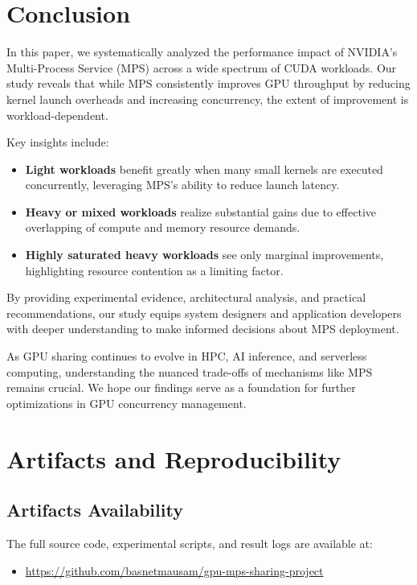 \documentclass[sigconf,nonacm]{acmart}
\begin{document}
\section{Conclusion}

In this paper, we systematically analyzed the performance impact of NVIDIA’s Multi-Process Service (MPS) across a wide spectrum of CUDA workloads. Our study reveals that while MPS consistently improves GPU throughput by reducing kernel launch overheads and increasing concurrency, the extent of improvement is workload-dependent.

Key insights include:

\begin{itemize}
    \item \textbf{Light workloads} benefit greatly when many small kernels are executed concurrently, leveraging MPS’s ability to reduce launch latency.
    \item \textbf{Heavy or mixed workloads} realize substantial gains due to effective overlapping of compute and memory resource demands.
    \item \textbf{Highly saturated heavy workloads} see only marginal improvements, highlighting resource contention as a limiting factor.
\end{itemize}

By providing experimental evidence, architectural analysis, and practical recommendations, our study equips system designers and application developers with deeper understanding to make informed decisions about MPS deployment.

As GPU sharing continues to evolve in HPC, AI inference, and serverless computing, understanding the nuanced trade-offs of mechanisms like MPS remains crucial. We hope our findings serve as a foundation for further optimizations in GPU concurrency management.

\section{Artifacts and Reproducibility}
\subsection{Artifacts Availability}

The full source code, experimental scripts, and result logs are available at:

\begin{itemize}
    \item \url{https://github.com/basnetmausam/gpu-mps-sharing-project}
\end{itemize}
\end{document}
